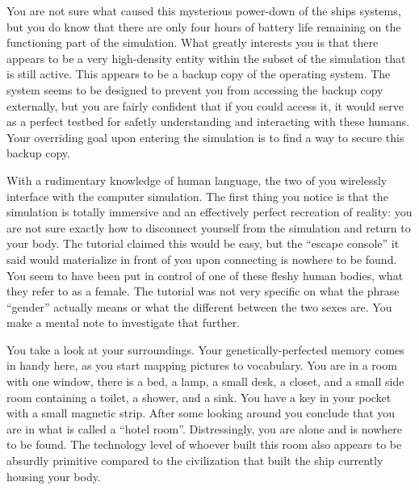 \documentclass[char]{guildcamp1}
\begin{document}
You are not sure what caused this mysterious power-down of the ships systems, but you do know that there are only four hours of battery life remaining on the functioning part of the simulation. What greatly interests you is that there appears to be a very high-density entity within the subset of the simulation that is still active. This appears to be a backup copy of the operating system. The system seems to be designed to prevent you from accessing the backup copy externally, but you are fairly confident that if you could access it, it would serve as a perfect testbed for safetly understanding and interacting with these humans. Your overriding goal upon entering the simulation is to find a way to secure this backup copy.

With a rudimentary knowledge of human language, the two of you wirelessly interface with the computer simulation. The first thing you notice is that the simulation is totally immersive and an effectively perfect recreation of reality: you are not sure exactly how to disconnect yourself from the simulation and return to your body. The tutorial claimed this would be easy, but the ``escape console'' it said would materialize in front of you upon connecting is nowhere to be found. You seem to have been put in control of one of these fleshy human bodies, what they refer to as a female. The tutorial was not very specific on what the phrase ``gender'' actually means or what the different between the two sexes are. You make a mental note to investigate that further.

You take a look at your surroundings. Your genetically-perfected memory comes in handy here, as you start mapping pictures to vocabulary. You are in a room with one window, there is a bed, a lamp, a small desk, a closet, and a small side room containing a toilet, a shower, and a sink. You have a key in your pocket with a small magnetic strip. After some looking around you conclude that you are in what is called a ``hotel room''. Distressingly, you are alone and \cActive{\name} is nowhere to be found. The technology level of whoever built this room also appears to be absurdly primitive compared to the civilization that built the ship currently housing your body.
\end{document}
